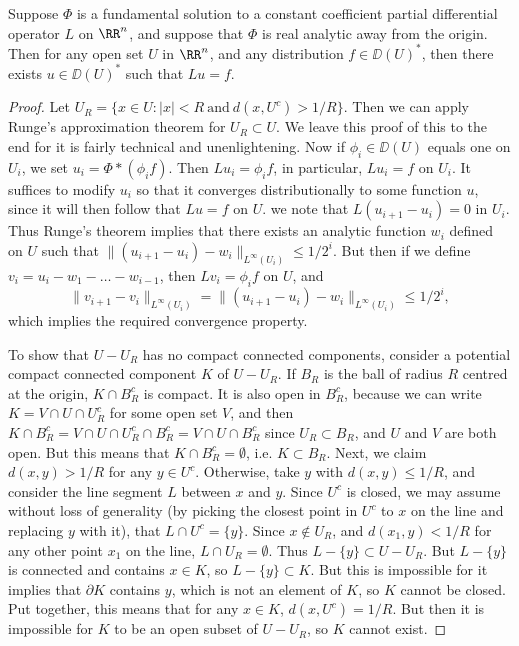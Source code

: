 \begin{theorem}
    Suppose $\Phi$ is a fundamental solution to a constant coefficient partial differential operator $L$ on $\RR^n$, and suppose that $\Phi$ is real analytic away from the origin. Then for any open set $U$ in $\RR^n$, and any distribution $f \in \DD(U)^*$, then there exists $u \in \DD(U)^*$ such that $Lu = f$.
\end{theorem}
\begin{proof}
    Let $U_R = \{ x \in U: |x| < R\ \text{and}\ d(x,U^c) > 1/R \}$. Then we can apply Runge's approximation theorem for $U_R \subset U$. We leave this proof of this to the end for it is fairly technical and unenlightening. Now if $\phi_i \in \DD(U)$ equals one on $U_i$, we set $u_i = \Phi * (\phi_i f)$. Then $Lu_i = \phi_i f$, in particular, $Lu_i = f$ on $U_i$. It suffices to modify $u_i$ so that it converges distributionally to some function $u$, since it will then follow that $Lu = f$ on $U$. we note that $L(u_{i+1} - u_i) = 0$ in $U_i$. Thus Runge's theorem implies that there exists an analytic function $w_i$ defined on $U$ such that $\| (u_{i+1} - u_i) - w_i \|_{L^\infty(U_i)} \leq 1/2^i$. But then if we define $v_i = u_i - w_1 - \dots - w_{i-1}$, then $Lv_i = \phi_i f$ on $U$, and
    \[ \| v_{i+1} - v_i \|_{L^\infty(U_i)} = \| (u_{i+1} - u_i) - w_i \|_{L^\infty(U_i)} \leq 1/2^i, \]
    which implies the required convergence property.

    To show that $U - U_R$ has no compact connected components, consider a potential compact connected component $K$ of $U - U_R$. If $B_R$ is the ball of radius $R$ centred at the origin, $K \cap B_R^c$ is compact. It is also open in $B_R^c$, because we can write $K = V \cap U \cap U_R^c$ for some open set $V$, and then $K \cap B_R^c = V \cap U \cap U_R^c \cap B_R^c = V \cap U \cap B_R^c$ since $U_R \subset B_R$, and $U$ and $V$ are both open. But this means that $K \cap B_R^c = \emptyset$, i.e. $K \subset B_R$. Next, we claim $d(x,y) > 1/R$ for any $y \in U^c$. Otherwise, take $y$ with $d(x,y) \leq 1/R$, and consider the line segment $L$ between $x$ and $y$. Since $U^c$ is closed, we may assume without loss of generality (by picking the closest point in $U^c$ to $x$ on the line and replacing $y$ with it), that $L \cap U^c = \{ y \}$. Since $x \not \in U_R$, and $d(x_1,y) < 1/R$ for any other point $x_1$ on the line, $L \cap U_R = \emptyset$. Thus $L - \{ y \} \subset U - U_R$. But $L - \{ y \}$ is connected and contains $x \in K$, so $L - \{ y \} \subset K$. But this is impossible for it implies that $\partial K$ contains $y$, which is not an element of $K$, so $K$ cannot be closed. Put together, this means that for any $x \in K$, $d(x,U^c) = 1/R$. But then it is impossible for $K$ to be an open subset of $U - U_R$, so $K$ cannot exist.
\end{proof}

